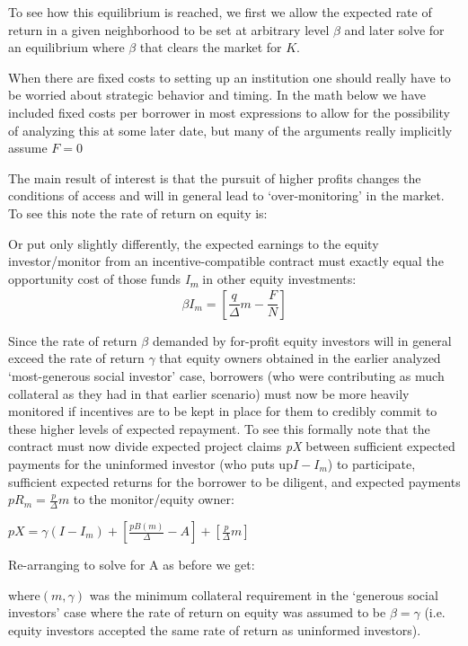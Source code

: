 \documentclass[letterpaper, 12pt]{article}
\begin{document}
\begin{appendices}
To see how this equilibrium is reached, we first we allow the expected rate of return in a given neighborhood to be set at arbitrary level $\beta$
and later solve for an equilibrium where $\beta$ that clears the market for $K$.

When there are fixed costs to setting up an institution one should really have to be worried about strategic behavior and timing. In the math below we have included fixed costs per borrower in most expressions to allow for the possibility of analyzing this at some later date, but many of the arguments really implicitly assume $F=0$

The main result of interest is that the pursuit of higher profits changes the conditions of access and will in general lead to `over-monitoring' in the market. To see this note the rate of return on equity is:

Or put only slightly differently, the expected earnings to the equity investor/monitor from an incentive-compatible contract must exactly equal the opportunity cost of those funds \emph{I\textsubscript{m}} in
other equity investments:
\begin{equation}
  \beta I_{m} = \left\lbrack \frac{q}{\Delta}m - \frac{F}{N} \right\rbrack
\end{equation}

Since the rate of return $\beta$ demanded by for-profit equity investors will
in general exceed the rate of return $\gamma$ that equity owners obtained in
the earlier analyzed `most-generous social investor' case, borrowers
(who were contributing as much collateral as they had in that earlier
scenario) must now be more heavily monitored if incentives are to be
kept in place for them to credibly commit to these higher levels of
expected repayment. To see this formally note that the contract must now
divide expected project claims \emph{pX} between sufficient expected
payments for the uninformed investor (who puts up\(I - I_{m}\)) to
participate, sufficient expected returns for the borrower to be
diligent, and expected payments \(pR_{m} = \frac{p}{\Delta}m\) to the
monitor/equity owner:

\(pX = \gamma(I - I_{m}) + \left\lbrack \frac{pB(m)}{\Delta} - A \right\rbrack + \left\lbrack \frac{p}{\Delta}m \right\rbrack\)

Re-arranging to solve for A as before we get:

where\((m,\gamma)\) was the minimum collateral requirement in the
`generous social investors' case where the rate of return on equity was
assumed to be $\beta=\gamma$ (i.e. equity investors accepted the same rate of
return as uninformed investors).


\end{appendices}
\end{document}
